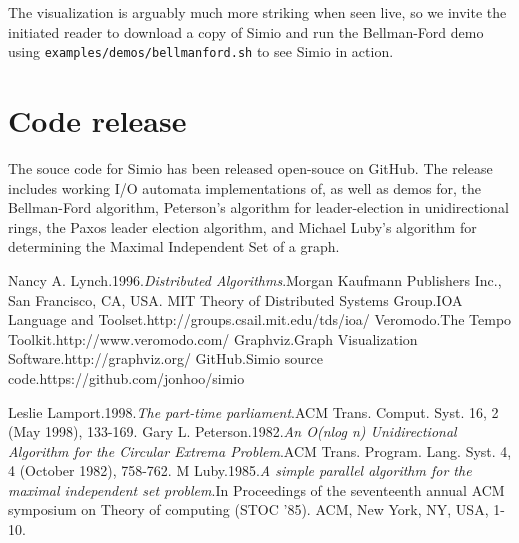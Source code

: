 \documentclass{scrartcl}
\begin{document}
The visualization is arguably much more striking when seen live, so we invite
the initiated reader to download a copy of Simio and run the Bellman-Ford demo
using \texttt{examples/demos/bellmanford.sh} to see Simio in action.

\section{Code release}

The souce code for Simio has been released open-souce on GitHub\cite{simio}.
The release includes working I/O automata implementations of, as well as demos
for, the Bellman-Ford algorithm, Peterson's algorithm for leader-election in
unidirectional rings\cite{peterson}, the Paxos leader election
algorithm\cite{paxos}, and Michael Luby's algorithm for determining the Maximal
Independent Set of a graph\cite{lubymis}.

\begin{thebibliography}{1}
 Nancy A. Lynch.\@ 1996.\@ {\em Distributed Algorithms}.\@ Morgan Kaufmann Publishers Inc., San Francisco, CA, USA. 
 MIT Theory of Distributed Systems Group.\@ IOA Language and Toolset.\@ http://groups.csail.mit.edu/tds/ioa/
 Veromodo.\@ The Tempo Toolkit.\@ http://www.veromodo.com/
 Graphviz.\@ Graph Visualization Software.\@ http://graphviz.org/
 GitHub.\@ Simio source code.\@ https://github.com/jonhoo/simio

 Leslie Lamport.\@ 1998.\@ {\em The part-time parliament}.\@ ACM Trans.  Comput. Syst. 16, 2 (May 1998), 133-169.
 Gary L. Peterson.\@ 1982.\@ {\em An O(nlog n) Unidirectional Algorithm for the Circular Extrema Problem}.\@ ACM Trans. Program. Lang.  Syst. 4, 4 (October 1982), 758-762.
 M Luby.\@ 1985.\@ {\em A simple parallel algorithm for the maximal independent set problem}.\@ In Proceedings of the seventeenth annual ACM symposium on Theory of computing (STOC '85). ACM, New York, NY, USA, 1-10.
\end{thebibliography}
\end{document}
